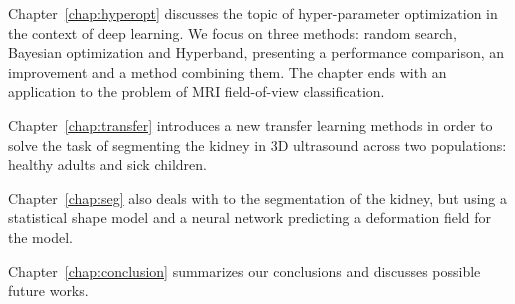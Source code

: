 Chapter~\ref{chap:hyperopt} discusses the topic of hyper-parameter optimization in the context of deep learning. We focus on three methods: random search, Bayesian optimization and Hyperband, presenting a performance comparison, an improvement and a method combining them. The chapter ends with an application to the problem of MRI field-of-view classification.

Chapter~\ref{chap:transfer} introduces a new transfer learning methods in order to solve the task of segmenting the kidney in 3D ultrasound across two populations: healthy adults and sick children.

Chapter~\ref{chap:seg} also deals with to the segmentation of the kidney, but using a statistical shape model and a neural network predicting a deformation field for the model.

Chapter~\ref{chap:conclusion} summarizes our conclusions and discusses possible future works.
